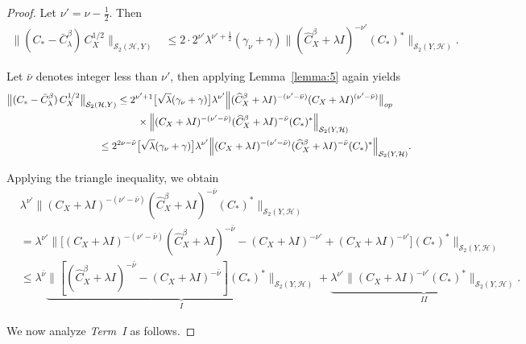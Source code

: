 \documentclass[twoside,11pt]{article}
\begin{document}
\begin{proof}
\noindent
Let $\nu' = \nu-\tfrac12$. Then
\begin{align*}
\big\|(C_*-\bar{C}_{\lambda}^\beta)\, C_X^{1/2} \big\|_{\mathcal S_2(\mathcal H,Y)}
&\le
2\cdot 2^{\nu'}\lambda^{\nu'+\frac12}(\gamma_\nu+\gamma)
\bigl\|
(\widehat C_X^{\beta}+\lambda I)^{-\nu'}
(C_*)^*\bigr\|_{\mathcal S_2(Y,\mathcal H)}.
\end{align*}


\noindent
Let $\bar{\nu}$ denotes integer less than $\nu'$, then applying Lemma~\ref{lemma:5} again yields
\begin{align*}
\big\|(C_*-\bar{C}_{\lambda}^\beta)\, C_X^{1/2} \big\|_{\mathcal S_2(\mathcal H,Y)}
&\le 
2^{\nu'+1}
\bigl[\sqrt \lambda(\gamma_\nu+\gamma)\bigr]
\lambda^{\nu'} \Bigl\|
(\widehat C_X^{\beta}+\lambda I)^{-(\nu'-\bar \nu)}
(C_X+\lambda I)^{(\nu'-\bar \nu)} 
\bigr\|_{op} \\
& \qquad \times
\Bigl\|
(C_X+\lambda I)^{-(\nu'-\bar \nu)}
(\widehat C_X^{\beta}+\lambda I)^{-\bar \nu}
(C_*)^*
\Bigr\|_{\mathcal S_2(Y,\mathcal H)} \\
&\!\!\!\!\!\!\!\!\!\!\!\le
2^{2\nu-\bar \nu}
\bigl[\sqrt \lambda(\gamma_\nu+\gamma)\bigr]
\lambda^{\nu'}
\Bigl\|
(C_X+\lambda I)^{-(\nu'-\bar \nu)}
(\widehat C_X^{\beta}+\lambda I)^{-\bar \nu}
(C_*)^*
\Bigr\|_{\mathcal S_2(Y,\mathcal H)}.
\end{align*}

\noindent
Applying the triangle inequality, we obtain
\begin{align*}
&\lambda^{\nu'}
\bigl\|
(C_X+\lambda I)^{-(\nu'-\bar \nu)}
(\widehat C_X^{\beta}+\lambda I)^{-\bar \nu}
(C_*)^*
\bigr\|_{\mathcal S_2(Y,\mathcal H)} \\
&=
\lambda^{\nu'}
\bigl\|
\bigl[
(C_X+\lambda I)^{-(\nu'-\bar \nu)}
(\widehat C_X^{\beta}+\lambda I)^{-\bar \nu}
-
(C_X+\lambda I)^{- \nu'}
+
(C_X+\lambda I)^{- \nu'}
\bigr]
(C_*)^*
\bigr\|_{\mathcal S_2(Y,\mathcal H)} \\
&\le
\lambda^{\bar \nu} \underbrace{
\bigl\| [
(\widehat C_X^{\beta}+\lambda I)^{-\bar \nu}
-
(C_X+\lambda I)^{-\bar \nu}]
(C_*)^*
\bigr\|_{\mathcal S_2(Y,\mathcal H)}
}_{I}
+
\underbrace{
\lambda^{\nu'}
\|(C_X+\lambda I)^{-\nu'}(C_*)^*\|_{\mathcal S_2(Y,\mathcal H)}
}_{II}.
\end{align*}

\noindent
We now analyze \emph{Term~I} as follows.


\end{proof}
\end{document}
